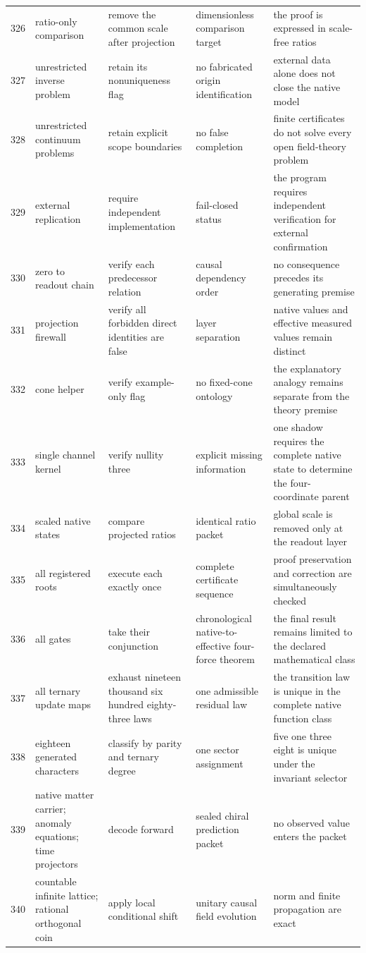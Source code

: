 \documentclass[11pt]{article}
\numberwithin{equation}{section}
\theoremstyle{remark}
\begin{document}
\begin{landscape}
\begin{longtable}{p{0.65cm}p{3.5cm}p{4.0cm}p{4.0cm}p{4.6cm}}
326&ratio-only comparison&remove the common scale after projection&dimensionless comparison target&the proof is expressed in scale-free ratios\\
327&unrestricted inverse problem&retain its nonuniqueness flag&no fabricated origin identification&external data alone does not close the native model\\
328&unrestricted continuum problems&retain explicit scope boundaries&no false completion&finite certificates do not solve every open field-theory problem\\
329&external replication&require independent implementation&fail-closed status&the program requires independent verification for external confirmation\\
330&zero to readout chain&verify each predecessor relation&causal dependency order&no consequence precedes its generating premise\\
331&projection firewall&verify all forbidden direct identities are false&layer separation&native values and effective measured values remain distinct\\
332&cone helper&verify example-only flag&no fixed-cone ontology&the explanatory analogy remains separate from the theory premise\\
333&single channel kernel&verify nullity three&explicit missing information&one shadow requires the complete native state to determine the four-coordinate parent\\
334&scaled native states&compare projected ratios&identical ratio packet&global scale is removed only at the readout layer\\
335&all registered roots&execute each exactly once&complete certificate sequence&proof preservation and correction are simultaneously checked\\
336&all gates&take their conjunction&chronological native-to-effective four-force theorem&the final result remains limited to the declared mathematical class\\
337&all ternary update maps&exhaust nineteen thousand six hundred eighty-three laws&one admissible residual law&the transition law is unique in the complete native function class\\
338&eighteen generated characters&classify by parity and ternary degree&one sector assignment&five one three eight is unique under the invariant selector\\
339&native matter carrier; anomaly equations; time projectors&decode forward&sealed chiral prediction packet&no observed value enters the packet\\
340&countable infinite lattice; rational orthogonal coin&apply local conditional shift&unitary causal field evolution&norm and finite propagation are exact\\
\bottomrule\end{longtable}

\end{landscape}
\end{document}
